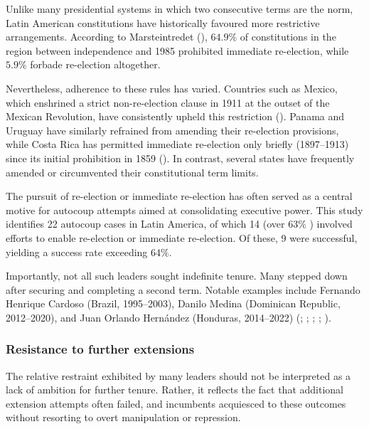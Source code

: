 \documentclass[
  12pt,
]{report}
\begin{document}
Unlike many presidential systems in which two consecutive terms are the
norm, Latin American constitutions have historically favoured more
restrictive arrangements. According to Marsteintredet
(), \(64.9\%\) of constitutions
in the region between independence and 1985 prohibited immediate
re-election, while \(5.9\%\) forbade re-election altogether.

Nevertheless, adherence to these rules has varied. Countries such as
Mexico, which enshrined a strict non-re-election clause in 1911 at the
outset of the Mexican Revolution, have consistently upheld this
restriction (). Panama and
Uruguay have similarly refrained from amending their re-election
provisions, while Costa Rica has permitted immediate re-election only
briefly (1897--1913) since its initial prohibition in 1859
(). In contrast,
several states have frequently amended or circumvented their
constitutional term limits.

The pursuit of re-election or immediate re-election has often served as
a central motive for autocoup attempts aimed at consolidating executive
power. This study identifies 22 autocoup cases in Latin America, of
which 14 (over \(63\%\) ) involved efforts to enable re-election or
immediate re-election. Of these, 9 were successful, yielding a success
rate exceeding \(64\%\).

Importantly, not all such leaders sought indefinite tenure. Many stepped
down after securing and completing a second term. Notable examples
include Fernando Henrique Cardoso (Brazil, 1995--2003), Danilo Medina
(Dominican Republic, 2012--2020), and Juan Orlando Hernández (Honduras,
2014--2022) (;
;
;
; ).

\subsubsection*{Resistance to further
extensions}\label{resistance-to-further-extensions}

The relative restraint exhibited by many leaders should not be
interpreted as a lack of ambition for further tenure. Rather, it
reflects the fact that additional extension attempts often failed, and
incumbents acquiesced to these outcomes without resorting to overt
manipulation or repression.
\end{document}
